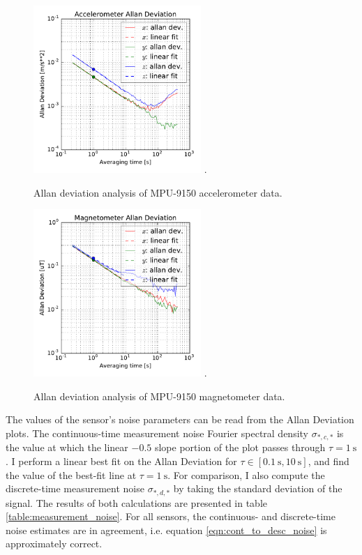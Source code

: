 \documentclass[conference]{IEEEtran}
\begin{document}
\begin{figure}[!t]
  \centering
  \includegraphics[width=2.5in]{figures/accel_data_allan.pdf}
  \DeclareGraphicsExtensions.
  \caption{Allan deviation analysis of MPU-9150 accelerometer data.}
  \label{accel_data_allan}
\end{figure}

\begin{figure}[!t]
  \centering
  \includegraphics[width=2.5in]{figures/mag_data_allan.pdf}
  \DeclareGraphicsExtensions.
  \caption{Allan deviation analysis of MPU-9150 magnetometer data.}
  \label{mag_data_allan}
\end{figure}

The values of the sensor's noise parameters can be read from the Allan Deviation plots. The continuous-time measurement noise Fourier spectral density $\sigma_{*,c,*}$ is the value at which the linear $-0.5$ slope portion of the plot passes through $\tau = \SI{1}{\second}$ \cite{UCAM-CL-TR-696}. I perform a linear best fit on the Allan Deviation for $\tau \in [\SI{0.1}{\second}, \SI{10}{\second}]$, and find the value of the best-fit line at $\tau = \SI{1}{\second}$. For comparison, I also compute the discrete-time measurement noise $\sigma_{*,d,*}$ by taking the standard deviation of the signal. The results of both calculations are presented in table \ref{table:measurement_noise}. For all sensors, the continuous- and discrete-time noise estimates are in agreement, i.e. equation \ref{eqn:cont_to_desc_noise} is approximately correct.\\
\end{document}

